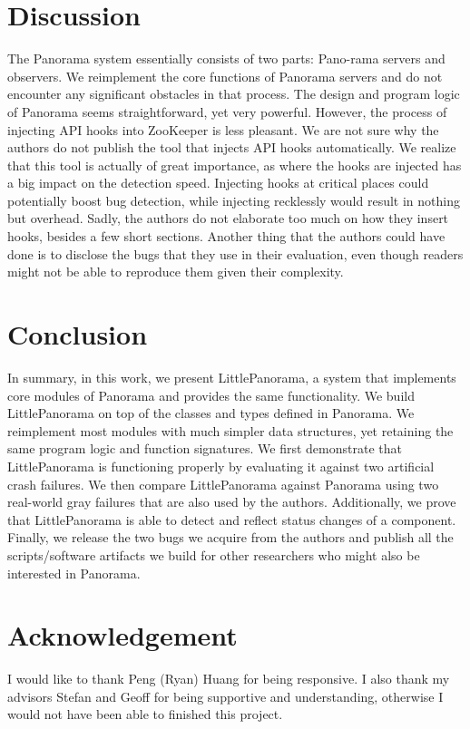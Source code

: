 \section{Discussion}
The Panorama system essentially consists of two parts: Pano-rama servers and observers. We reimplement the core functions of Panorama servers and do not encounter any significant obstacles in that process. The design and program logic of Panorama seems straightforward, yet very powerful. However, the process of injecting API hooks into ZooKeeper is less pleasant. We are not sure why the authors do not publish the tool that injects API hooks automatically. We realize that this tool is actually of great importance, as where the hooks are injected has a big impact on the detection speed. Injecting hooks at critical places could potentially boost bug detection, while injecting recklessly would result in nothing but overhead. Sadly, the authors do not elaborate too much on how they insert hooks, besides a few short sections. Another thing that the authors could have done is to disclose the bugs that they use in their evaluation, even though readers might not be able to reproduce them given their complexity. 

\section{Conclusion}
In summary, in this work, we present LittlePanorama, a system that implements core modules of Panorama and provides the same functionality. We build LittlePanorama on top of the classes and types defined in Panorama. We reimplement most modules with much simpler data structures, yet retaining the same program logic and function signatures. We first demonstrate that LittlePanorama is functioning properly by evaluating it against two artificial crash failures. We then compare LittlePanorama against Panorama using two real-world gray failures that are also used by the authors. Additionally, we prove that LittlePanorama is able to detect and reflect status changes of a component. Finally, we release the two bugs we acquire from the authors and publish all the scripts/software artifacts we build for other researchers who might also be interested in Panorama.

\section{Acknowledgement}
I would like to thank Peng (Ryan) Huang for being responsive. I also thank my advisors Stefan and Geoff for being supportive and understanding, otherwise I would not have been able to finished this project.